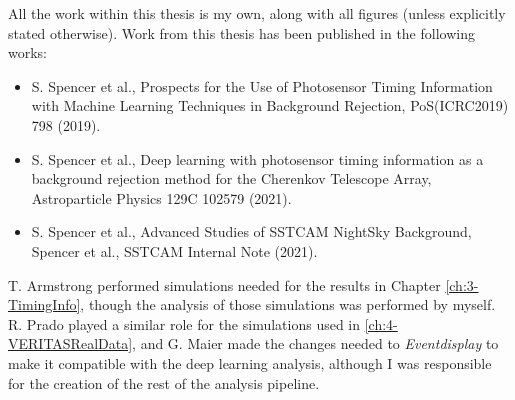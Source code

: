 All the work within this thesis is my own, along with all figures (unless explicitly stated otherwise). Work from this thesis has been published in the following works:
\begin{centering}
\begin{itemize}
    \item S. Spencer et al., Prospects for the Use of Photosensor Timing Information with Machine Learning Techniques in Background Rejection, PoS(ICRC2019) 798 (2019).
    \item S. Spencer et al., Deep learning with photosensor timing information as a background rejection method for the Cherenkov Telescope Array, Astroparticle Physics 129C 102579 (2021).
    \item S. Spencer et al., Advanced Studies of SSTCAM NightSky Background, Spencer et al., SSTCAM Internal Note (2021). 
\end{itemize}
\end{centering}



T. Armstrong performed simulations needed for the results in Chapter \ref{ch:3-TimingInfo}, though the analysis of those simulations was performed by myself. R. Prado played a similar role for the simulations used in \ref{ch:4-VERITASRealData}, and G. Maier made the changes needed to \textit{Eventdisplay} to make it compatible with the deep learning analysis, although I was responsible for the creation of the rest of the analysis pipeline.